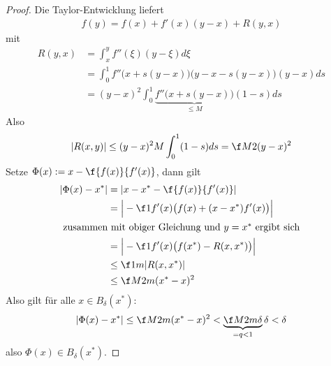 \documentclass[11pt]{scrartcl}
\begin{document}
\begin{st}
\begin{note}
		\begin{proof}
			Die Taylor-Entwicklung liefert
			\begin{align*}
				f(y) = f(x) + f'(x)(y-x) + R(y,x)
			\end{align*}
			mit 
			\begin{align*}
				R(y,x) 
				&= \int_x^y f''(\xi) (y-\xi) d\xi \\
				&= \int_0^1 f''\big(x+s(y-x)\big)  \big(y-x-s(y-x)\big)(y-x) ds \\
				&= (y-x)^2 \int_0^1 \underbrace{f''\big(x+s(y-x)\big)}_{\le M} (1-s) ds
			\end{align*}
			Also
			\[
				|R(x,y) | \le (y-x)^2 M \int_0^1 (1-s) ds = \f M2 (y-x)^2
			\]
			Setze $\Phi(x) := x - \f {f(x)}{f'(x)}$, dann gilt
			\begin{align*}
				|\Phi(x) - x^*|
				&= |x-x^* - \f {f(x)}{f'(x)}| \\
				&= \Big| -\f 1{f'(x)} \big(f(x) + (x-x^*)f'(x) \big) \Big| \\
			\intertext{
				zusammen mit obiger Gleichung und $y=x^*$ ergibt sich
			}
				&= \Big| - \f 1{f'(x)} \big(f(x^*) - R(x,x^*)\big) \Big| \\
				&\le \f 1m |R(x,x^*)| \\
				&\le \f M{2m} (x^* - x)^2
			\end{align*}
			Also gilt für alle $x\in B_\delta(x^*)$:
			\[
				|\Phi(x) - x^*| \le \f M{2m}(x^*-x)^2 < \underbrace{\f M{2m} \delta}_{=q<1} \delta < \delta
			\]
			also $\Phi(x) \in B_\delta(x^*)$.


\end{proof}
\end{note}
\end{st}
\end{document}
